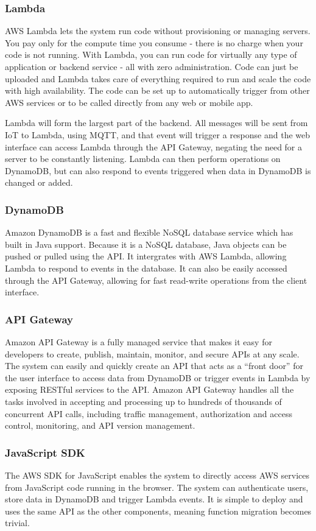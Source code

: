 \documentclass{article}
\begin{document}
	\subsubsection{Lambda}
	AWS Lambda lets the system run code without provisioning or managing servers. You pay only for the compute time you consume - there is no charge when your code is not running. With Lambda, you can run code for virtually any type of application or backend service - all with zero administration. Code can just be uploaded and Lambda takes care of everything required to run and scale the code with high availability. The code can be set up to automatically trigger from other AWS services or to be called directly from any web or mobile app.

	Lambda will form the largest part of the backend. All messages will be sent from IoT to Lambda, using MQTT, and that event will trigger a response and the web interface can access Lambda through the API Gateway, negating the need for a server to be constantly listening. Lambda can then perform operations on DynamoDB, but can also respond to events triggered when data in DynamoDB is changed or added. 
	\subsubsection{DynamoDB}
	Amazon DynamoDB is a fast and flexible NoSQL database service which has built in Java support. Because it is a NoSQL database, Java objects can be pushed or pulled using the API. It intergrates with AWS Lambda, allowing Lambda to respond to events in the database. It can also be easily accessed through the API Gateway, allowing for fast read-write operations from the client interface.
	\subsubsection{API Gateway}
	Amazon API Gateway is a fully managed service that makes it easy for developers to create, publish, maintain, monitor, and secure APIs at any scale. The system can easily and quickly create an API that acts as a “front door” for the user interface to access data from DynamoDB or trigger events in Lambda by exposing RESTful services to the API. Amazon API Gateway handles all the tasks involved in accepting and processing up to hundreds of thousands of concurrent API calls, including traffic management, authorization and access control, monitoring, and API version management.
	\subsubsection{JavaScript SDK}
	The AWS SDK for JavaScript enables the system to directly access AWS services from JavaScript code running in the browser. The system can authenticate users, store data in DynamoDB and trigger Lambda events. It is simple to deploy and uses the same API as the other components, meaning function migration becomes trivial.
\end{document}
